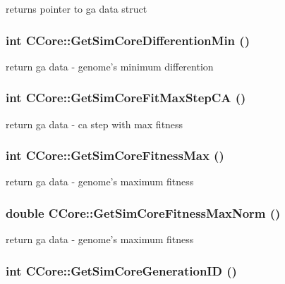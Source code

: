 \label{classCCore_a4ddbbc5f50ff19b2d2b9095792b648a6}
returns pointer to ga data struct \hypertarget{classCCore_a15daf074c713232f20f772b20098e716}{
\subsubsection[{GetSimCoreDifferentionMin}]{\setlength{\rightskip}{0pt plus 5cm}int CCore::GetSimCoreDifferentionMin ()}}
\label{classCCore_a15daf074c713232f20f772b20098e716}
return ga data -\/ genome's minimum differention \hypertarget{classCCore_a974f6f52d6cb6362718c7e1a06a767c9}{
\subsubsection[{GetSimCoreFitMaxStepCA}]{\setlength{\rightskip}{0pt plus 5cm}int CCore::GetSimCoreFitMaxStepCA ()}}
\label{classCCore_a974f6f52d6cb6362718c7e1a06a767c9}
return ga data -\/ ca step with max fitness \hypertarget{classCCore_a0de6196e934c38a12fd26875b5e020be}{
\subsubsection[{GetSimCoreFitnessMax}]{\setlength{\rightskip}{0pt plus 5cm}int CCore::GetSimCoreFitnessMax ()}}
\label{classCCore_a0de6196e934c38a12fd26875b5e020be}
return ga data -\/ genome's maximum fitness \hypertarget{classCCore_a383218fe410dd8425ede9772277e708f}{
\subsubsection[{GetSimCoreFitnessMaxNorm}]{\setlength{\rightskip}{0pt plus 5cm}double CCore::GetSimCoreFitnessMaxNorm ()}}
\label{classCCore_a383218fe410dd8425ede9772277e708f}
return ga data -\/ genome's maximum fitness \hypertarget{classCCore_a18ce09c76b45dd18a7932c4832f61300}{
\subsubsection[{GetSimCoreGenerationID}]{\setlength{\rightskip}{0pt plus 5cm}int CCore::GetSimCoreGenerationID ()}}
